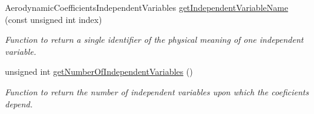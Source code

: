 \begin{DoxyCompactItemize}
Aerodynamic\+Coefficients\+Independent\+Variables \hyperlink{classtudat_1_1aerodynamics_1_1ControlSurfaceIncrementAerodynamicInterface_a8b2249fbdca499f342f09fdaaa3f9545}{get\+Independent\+Variable\+Name} (const unsigned int index)
\begin{DoxyCompactList}\small\item\em Function to return a single identifier of the physical meaning of one independent variable. \end{DoxyCompactList}\item 
unsigned int \hyperlink{classtudat_1_1aerodynamics_1_1ControlSurfaceIncrementAerodynamicInterface_aaee06c7be7a99ece4c3531d2d0ad42c7}{get\+Number\+Of\+Independent\+Variables} ()
\begin{DoxyCompactList}\small\item\em Function to return the number of independent variables upon which the coeficients depend. \end{DoxyCompactList}\end{DoxyCompactItemize}
